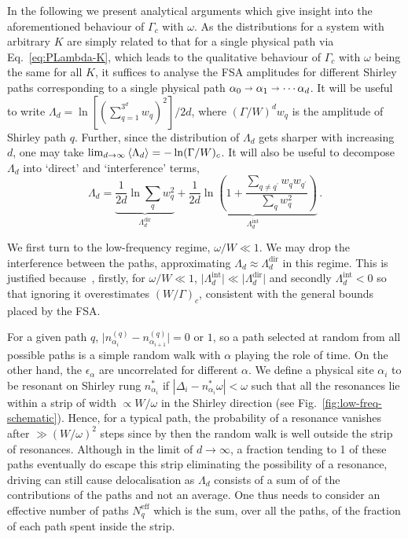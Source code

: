 \documentclass[aps,prl,twocolumn,superscriptaddress,nobalancelastpage,longbibliography]{revtex4-2}
\begin{document}
In the following we present analytical arguments which give insight into the aforementioned behaviour of $\Gamma_c$ with $\omega$. As the distributions for a system with arbitrary $K$ are simply related to that for a single physical path via Eq.~\ref{eq:PLambda-K}, which leads to the qualitative behaviour of $\Gamma_c$ with $\omega$ being the same for all $K$, it suffices to analyse the FSA amplitudes for different Shirley paths corresponding to a single physical path $\alpha_0\shortrightarrow\alpha_1\shortrightarrow\cdots\alpha_d$. 
It will be useful to write  $\Lambda_d = \ln[(\sum_{q=1}^{3^d}w_q)^2]/2d$, where $(\Gamma/W)^d w_q$ is the amplitude of Shirley path $q$.
Further, since the distribution of $\Lambda_d$ gets sharper with increasing $d$, one may take $\lim_{d\to\infty}\braket{\Lambda_d}=-\ln(\Gamma/W)_c$.
It will also be useful to decompose $\Lambda_d$ into `direct' and `interference' terms,
\begin{equation}
	\Lambda_d = \underbrace{\frac{1}{2d}\ln\sum_q w_q^2}_{\Lambda_d^\mathrm{dir}}+\underbrace{\frac{1}{2d}\ln\left(1+\frac{\sum_{q\neq q^\prime}w_q w_{q^\prime}}{\sum_q w_q^2}\right)}_{\Lambda_d^\mathrm{int}}\,.
\end{equation}



We first turn to the low-frequency regime, $\omega/W\ll 1$.
We may drop the interference between the paths, approximating $\Lambda_d\approx\Lambda_d^\mathrm{dir}$ in this regime.
This is justified because~\cite{supp}, firstly, for $\omega/W\ll 1$, $\vert \Lambda_d^\mathrm{int}\vert\ll\vert \Lambda_d^\mathrm{dir}\vert$ and secondly $\Lambda_d^\mathrm{int}<0$ so that ignoring it overestimates $(W/\Gamma)_c$, consistent with the general bounds placed by the FSA.


For a given path $q$, ${\vert n_{\alpha_i}^{(q)}-n_{\alpha_{i+1}}^{(q)}\vert=0}$ or $1$, so a path selected at random from all possible paths is a simple random walk with $\alpha$ playing the role of time. On the other hand, the $\epsilon_\alpha$ are uncorrelated for different $\alpha$. 
We define a physical site $\alpha_i$ to be resonant on Shirley rung $n_{\alpha_i}^\ast$ if $\left|\Delta_i-n_{\alpha_i}^\ast\omega\right|<\omega$ such that all the resonances lie within a strip of width $\propto W/\omega$ in the Shirley direction (see Fig.~\ref{fig:low-freq-schematic}).
Hence, for a typical path, the probability of a resonance vanishes after $\gg(W/\omega)^2$ steps since by then the random walk is well outside the strip of resonances.
%
Although in the limit of $d\to\infty$, a fraction tending to 1 of these paths eventually do escape this strip eliminating the possibility of a resonance, driving can still cause delocalisation as $\Lambda_d$ consists of a sum of of the contributions of the paths and not an average.
%
One thus needs to consider an effective number of paths $N_q^\mathrm{eff}$ which is the sum, over all the paths, of the fraction of each path spent inside the strip.
%
\end{document}
